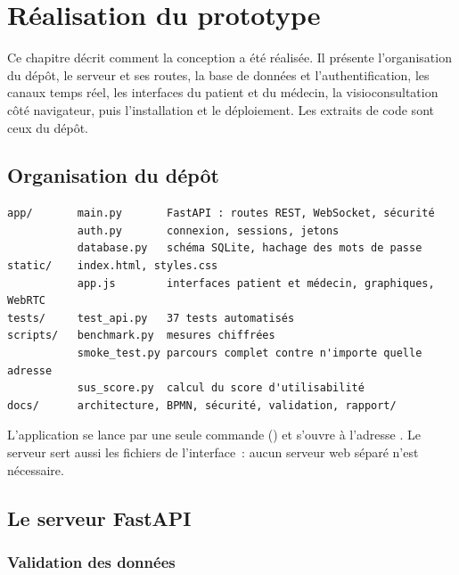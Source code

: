 \chapter{Réalisation du prototype}
\label{chap:realisation}

\introchap

Ce chapitre décrit comment la conception a été réalisée. Il présente l'organisation du dépôt, le serveur et ses routes, la base de données et l'authentification, les canaux temps réel, les interfaces du patient et du médecin, la visioconsultation côté navigateur, puis l'installation et le déploiement. Les extraits de code sont ceux du dépôt.

\section{Organisation du dépôt}

\begin{lstlisting}[language={}, numbers=none, caption={Arborescence du dépôt.}]
app/       main.py       FastAPI : routes REST, WebSocket, sécurité
           auth.py       connexion, sessions, jetons
           database.py   schéma SQLite, hachage des mots de passe
static/    index.html, styles.css
           app.js        interfaces patient et médecin, graphiques, WebRTC
tests/     test_api.py   37 tests automatisés
scripts/   benchmark.py  mesures chiffrées
           smoke_test.py parcours complet contre n'importe quelle adresse
           sus_score.py  calcul du score d'utilisabilité
docs/      architecture, BPMN, sécurité, validation, rapport/
\end{lstlisting}

L'application se lance par une seule commande () et s'ouvre à l'adresse . Le serveur sert aussi les fichiers de l'interface~: aucun serveur web séparé n'est nécessaire.

\section{Le serveur FastAPI}

\subsection{Validation des données}

